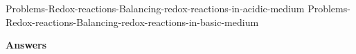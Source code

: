 \documentclass[main.tex]{subfiles}
\newcommand\chapterlabel{Ch-electrolytes}
\begin{document}
\begin{multicols*}{2}
{Problems-Redox-reactions-Balancing-redox-reactions-in-acidic-medium}
{Problems-Redox-reactions-Balancing-redox-reactions-in-basic-medium}









\end{multicols*}
\newpage
\begin{answersenvironment}
\begin{minipage}[c]{1\textwidth}
\begin{localsize}{10}
{\Large \bf Answers}
\printsolutions 
\end{localsize}
\end{minipage}\end{answersenvironment}
\end{document}
